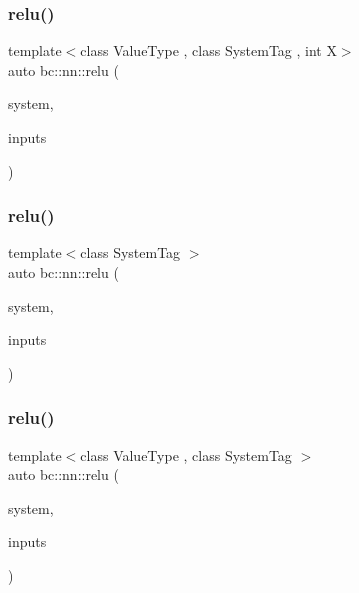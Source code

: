 \mbox{\label{namespacebc_1_1nn_a38872deedfd974a835678e32fc2cb5ce}} 
\subsubsection{\texorpdfstring{relu()}{relu()}\hspace{0.1cm}{\footnotesize\ttfamily [2/5]}}
{\footnotesize\ttfamily template$<$class Value\+Type , class System\+Tag , int X$>$ \\
auto bc\+::nn\+::relu (\begin{DoxyParamCaption}\item[{System\+Tag}]{system,  }\item[{\hyperlink{structbc_1_1Dim}{bc\+::\+Dim}$<$ X $>$}]{inputs }\end{DoxyParamCaption})}

\mbox{\label{namespacebc_1_1nn_a863a41473186e29b827b21b6009144e7}} 
\subsubsection{\texorpdfstring{relu()}{relu()}\hspace{0.1cm}{\footnotesize\ttfamily [3/5]}}
{\footnotesize\ttfamily template$<$class System\+Tag $>$ \\
auto bc\+::nn\+::relu (\begin{DoxyParamCaption}\item[{System\+Tag}]{system,  }\item[{\hyperlink{namespacebc_aaf8e3fbf99b04b1b57c4f80c6f55d3c5}{bc\+::size\+\_\+t}}]{inputs }\end{DoxyParamCaption})}

\mbox{\label{namespacebc_1_1nn_aead5ec7f5331b0334e7b41c922360236}} 
\subsubsection{\texorpdfstring{relu()}{relu()}\hspace{0.1cm}{\footnotesize\ttfamily [4/5]}}
{\footnotesize\ttfamily template$<$class Value\+Type , class System\+Tag $>$ \\
auto bc\+::nn\+::relu (\begin{DoxyParamCaption}\item[{System\+Tag}]{system,  }\item[{\hyperlink{namespacebc_aaf8e3fbf99b04b1b57c4f80c6f55d3c5}{bc\+::size\+\_\+t}}]{inputs }\end{DoxyParamCaption})}

